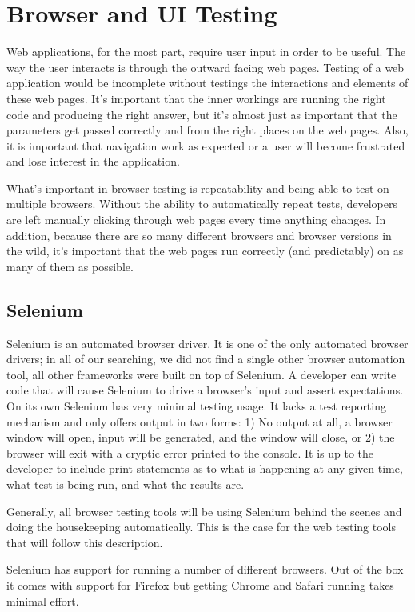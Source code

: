 \documentclass[12pt]{ucthesis}
\begin{document}
\section{Browser and UI Testing}
Web applications, for the most part, require user input in order to be useful. The way the user interacts is through the outward facing web pages. Testing of a web application would be incomplete without testings the interactions and elements of these web pages. It's important that the inner workings are running the right code and producing the right answer, but it's almost just as important that the parameters get passed correctly and from the right places on the web pages. Also, it is important that navigation work as expected or a user will become frustrated and lose interest in the application.

What's important in browser testing is repeatability and being able to test on multiple browsers. Without the ability to automatically repeat tests, developers are left manually clicking through web pages every time anything changes. In addition, because there are so many different browsers and browser versions in the wild, it's important that the web pages run correctly (and predictably) on as many of them as possible.

\subsection{Selenium}
Selenium\cite{Selenium} is an automated browser driver. It is one of the only automated browser drivers; in all of our searching, we did not find a single other browser automation tool, all other frameworks were built on top of Selenium. A developer can write code that will cause Selenium to drive a browser's input and assert expectations. On its own Selenium has very minimal testing usage. It lacks a test reporting mechanism and only offers output in two forms: 1) No output at all, a browser window will open, input will be generated, and the window will close, or 2) the browser will exit with a cryptic error printed to the console. It is up to the developer to include print statements as to what is happening at any given time, what test is being run, and what the results are.

Generally, all browser testing tools will be using Selenium behind the scenes and doing the housekeeping automatically. This is the case for the web testing tools that will follow this description.

Selenium has support for running a number of different browsers. Out of the box it comes with support for Firefox but getting Chrome and Safari running takes minimal effort.
\end{document}
